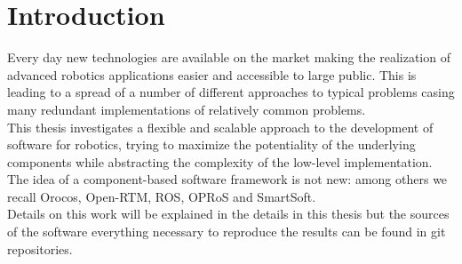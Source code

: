 \chapter{Introduction}
\label{ch:introduction} 
Every day new technologies are available on the market making the realization of advanced robotics applications easier and accessible to large public. This is leading to a spread of a  number of different approaches to typical problems casing many redundant implementations of relatively common problems.\\
This thesis investigates a flexible and scalable approach to the development of software for robotics, trying to maximize the potentiality of the underlying components while abstracting the complexity of the low-level implementation. The idea of a component-based software framework is not new: among others we recall Orocos, Open-RTM, ROS, OPRoS and SmartSoft.\\

Details on this work will be explained in the details in this thesis but the sources of the software everything necessary to reproduce the results can be found in git repositories.